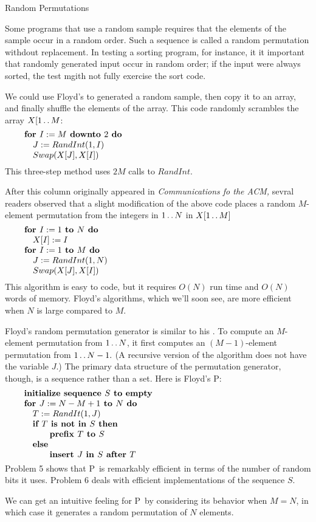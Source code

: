  Random Permutations

Some programs that use a random sample requires that the elements of the sample
occur in a random order. Such a sequence is called a random permutation withdout
replacement. In testing a sorting program, for instance, it it important that
randomly generated input occur in random order; if the input were always sorted,
the test mgith not fully exercise the sort code.

We could use Floyd's  to generated a random sample, then copy it to an
array, and finally shuffle the elements of the array. This code randomly
scrambles the array $X[1\mathinner{\ldotp\ldotp} M$:
$$\vbox{\let\par=\endgraf
\obeylines\sfcode`;=3000
{\bf for $I:=M$ downto $2$ do}
\quad $J:= RandInt(1, I)$
\quad $Swap(X[J], X[I])$
}$$
This three-step method uses $2M$ calls to $RandInt.$

After this column originally appeared in {\sl Communications fo the ACM,\/}
sevral readers observed that a slight modification of the above code places a
random $M$-element permutation from the integers in $1\mathinner{\ldotp\ldotp} N$ in
$X[1\mathinner{\ldotp\ldotp} M]$
$$\vbox{\let\par=\endgraf
\obeylines\sfcode`;=3000
{\bf for $I:=1$ to $N$ do}
\quad $X[I]:=I$
{\bf for $I:=1$ to $M$ do}
\quad $J:= RandInt(1, N)$
\quad $Swap(X[J], X[I])$
}$$
This algorithm is easy to code, but it requires $O(N)$ run time and $O(N)$ words
of memory. Floyd's algorithms, which we'll soon see, are more efficient when $N$
is large compared to $M$.

Floyd's random permutation generator is similar to his . To compute an
$M$-element permutation from $1\mathinner{\ldotp\ldotp} N$, it first computes an $(M-1)$-element
permutation from $1\mathinner{\ldotp\ldotp} N-1.$ (A recursive version of the algorithm does not
have the variable $J.$) The primary data structure of the permutation generator,
though, is a sequence rather than a set. Here is Floyd's \Alg P:
$$\vbox{\let\par=\endgraf
\obeylines\sfcode`;=3000
{\bf initialize sequence $S$ to empty}
{\bf for $J:=N-M+1$ to $N$ do}
\quad $T:=RandIt(1,J)$
\quad {\bf if $T$ is not in $S$ then}
\qquad\quad {\bf prefix $T$ to $S$}
\quad {\bf else}
\qquad\quad {\bf insert $J$ in $S$ after $T$}
}$$
Problem 5 shows that \Alg P\ is remarkably efficient in terms of the number of
random bits it uses. Problem 6 deals with efficient implementations of the
sequence $S.$

We can get an intuitive feeling for \Alg P\ by considering its behavior when
$M=N$, in which case it generates a random permutation of $N$ elements.
\bye
